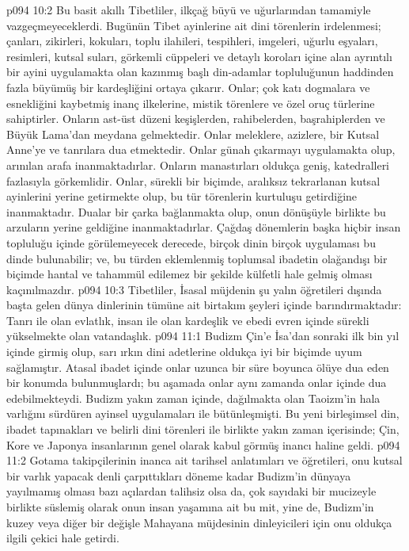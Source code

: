 \vs p094 10:2 Bu basit akıllı Tibetliler, ilkçağ büyü ve uğurlarından tamamiyle vazgeçmeyeceklerdi. Bugünün Tibet ayinlerine ait dini törenlerin irdelenmesi; çanları, zikirleri, kokuları, toplu ilahileri, tespihleri, imgeleri, uğurlu eşyaları, resimleri, kutsal suları, görkemli cüppeleri ve detaylı koroları içine alan ayrıntılı bir ayini uygulamakta olan kazınmış başlı din\hyp{}adamlar topluluğunun haddinden fazla büyümüş bir kardeşliğini ortaya çıkarır. Onlar; çok katı dogmalara ve esnekliğini kaybetmiş inanç ilkelerine, mistik törenlere ve özel oruç türlerine sahiptirler. Onların ast\hyp{}üst düzeni keşişlerden, rahibelerden, başrahiplerden ve Büyük Lama’dan meydana gelmektedir. Onlar meleklere, azizlere, bir Kutsal Anne’ye ve tanrılara dua etmektedir. Onlar günah çıkarmayı uygulamakta olup, arınılan arafa inanmaktadırlar. Onların manastırları oldukça geniş, katedralleri fazlasıyla görkemlidir. Onlar, sürekli bir biçimde, aralıksız tekrarlanan kutsal ayinlerini yerine getirmekte olup, bu tür törenlerin kurtuluşu getirdiğine inanmaktadır. Dualar bir çarka bağlanmakta olup, onun dönüşüyle birlikte bu arzuların yerine geldiğine inanmaktadırlar. Çağdaş dönemlerin başka hiçbir insan topluluğu içinde görülemeyecek derecede, birçok dinin birçok uygulaması bu dinde bulunabilir; ve, bu türden eklemlenmiş toplumsal ibadetin olağandışı bir biçimde hantal ve tahammül edilemez bir şekilde külfetli hale gelmiş olması kaçınılmazdır.
\vs p094 10:3 Tibetliler, İsasal müjdenin şu yalın öğretileri dışında başta gelen dünya dinlerinin tümüne ait birtakım şeyleri içinde barındırmaktadır: Tanrı ile olan evlatlık, insan ile olan kardeşlik ve ebedi evren içinde sürekli yükselmekte olan vatandaşlık.
\vs p094 11:1 Budizm Çin’e İsa’dan sonraki ilk bin yıl içinde girmiş olup, sarı ırkın dini adetlerine oldukça iyi bir biçimde uyum sağlamıştır. Atasal ibadet içinde onlar uzunca bir süre boyunca ölüye dua eden bir konumda bulunmuşlardı; bu aşamada onlar aynı zamanda onlar içinde dua edebilmekteydi. Budizm yakın zaman içinde, dağılmakta olan Taoizm’in hala varlığını sürdüren ayinsel uygulamaları ile bütünleşmişti. Bu yeni birleşimsel din, ibadet tapınakları ve belirli dini törenleri ile birlikte yakın zaman içerisinde; Çin, Kore ve Japonya insanlarının genel olarak kabul görmüş inancı haline geldi.
\vs p094 11:2 Gotama takipçilerinin inanca ait tarihsel anlatımları ve öğretileri, onu kutsal bir varlık yapacak denli çarpıttıkları döneme kadar Budizm’in dünyaya yayılmamış olması bazı açılardan talihsiz olsa da, çok sayıdaki bir mucizeyle birlikte süslemiş olarak onun insan yaşamına ait bu mit, yine de, Budizm’in kuzey veya diğer bir değişle Mahayana müjdesinin dinleyicileri için onu oldukça ilgili çekici hale getirdi.
